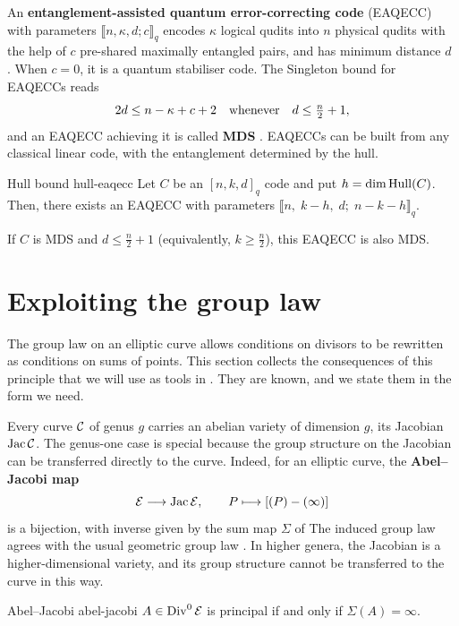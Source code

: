 \documentclass[twocolumn, 11pt]{scrartcl}
\begin{document}
An \textbf{entanglement-assisted quantum error-correcting code} (EAQECC) with parameters $\llbracket n,\kappa,d;c\rrbracket_q$ encodes $\kappa$ logical qudits into $n$ physical qudits with the help of $c$ pre-shared maximally entangled pairs, and has minimum distance $d$ \cite{brun2006correcting}. When $c=0$, it is a quantum stabiliser code. The Singleton bound for EAQECCs reads
\[ 2d\leq n-\kappa+c+2 \quad\text{whenever}\quad d\leq\tfrac{n}{2}+1, \]
and an EAQECC achieving it is called \textbf{MDS} \cite{lai2018linear}. EAQECCs can be built from any classical linear code, with the entanglement determined by the hull.

\begin{lemma}{Hull bound \cite[Lem.~16]{chen2023hulls}}{hull-eaqecc}
    Let $C$ be an $[n,k,d]_q$ code and put $h=\dim\operatorname{Hull}(C)$. Then, there exists an EAQECC with parameters $\llbracket n,\;k-h,\;d;\;n-k-h\rrbracket_q$.


    If $C$ is MDS and $d\leq\frac{n}{2}+1$ (equivalently, $k\geq\frac n2$), this EAQECC is also MDS.
\end{lemma}

\section{Exploiting the group law} \label{section:group-law}

The group law on an elliptic curve allows conditions on divisors to be rewritten as conditions on sums of points. This section collects the consequences of this principle that we will use as tools in . They are known, and we state them in the form we need.

Every curve $\mathcal{C}$ of genus $g$ carries an abelian variety of dimension $g$, its Jacobian $\operatorname{Jac}\mathcal{C}$. The genus-one case is special because the group structure on the Jacobian can be transferred directly to the curve. Indeed, for an elliptic curve, the \textbf{Abel--Jacobi map}
\[ \mathcal{E}\longrightarrow\operatorname{Jac}\mathcal{E}, \qquad P\longmapsto[(P)-(\infty)] \]
is a bijection, with inverse given by the sum map $\Sigma$ of  The induced group law agrees with the usual geometric group law \cite[\S~III.3]{silverman2009arithmetic}. In higher genera, the Jacobian is a higher-dimensional variety, and its group structure cannot be transferred to the curve in this way.

\begin{lemma}{Abel--Jacobi \cite[Cor.~III.3.5]{silverman2009arithmetic}}{abel-jacobi}
    $A\in\operatorname{Div}^0\mathcal{E}$ is principal if and only if $\Sigma(A)=\infty$.
\end{lemma}
\end{document}
